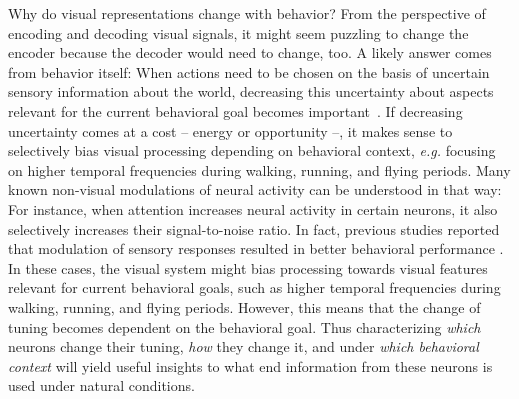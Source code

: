 \documentclass[B2,COG]{ercgrant}
\begin{document}
Why do visual representations change with behavior? From the perspective of encoding and decoding visual signals, it might seem puzzling to change the encoder because the decoder would need to change, too. 
A likely answer comes from behavior itself:
When actions need to be chosen on the basis of uncertain sensory information about the world, decreasing this uncertainty about aspects relevant for the current behavioral goal becomes important~\parencite{Chebolu2022-tb}. 
If decreasing uncertainty comes at a cost -- energy or opportunity --, it makes sense to selectively bias visual processing depending on behavioral context, \textit{e.g.} focusing on  higher temporal frequencies during walking, running, and flying periods.
Many known non-visual modulations of neural activity can be understood in that way: 
For instance, when attention increases neural activity in certain neurons, it also selectively increases their signal-to-noise ratio. 
In fact, previous studies reported that modulation of sensory responses resulted in better behavioral performance \parencite{Spitzer1988-kq, Bennett2013-rk, Dadarlat2017-jw, De_Gee2022-ir}.
In these cases, the visual system might bias processing towards visual features relevant for current behavioral goals, such as higher temporal frequencies during walking, running, and flying periods.
However, this means that the change of tuning becomes dependent on the behavioral goal.
Thus characterizing \textit{which} neurons change their tuning, \textit{how} they change it, and under \textit{which behavioral context} will yield useful insights to what end information from these neurons is used under natural conditions.
\end{document}
